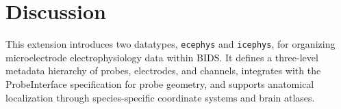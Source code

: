 \documentclass[fleqn,10pt]{article}
\newcommand{\rrid}[1]{\href{https://scicrunch.org/resolver/#1}{#1}}
\begin{document}


\section*{Discussion}\label{sec:discussion}

This extension introduces two datatypes, \texttt{ecephys} and \texttt{icephys}, for organizing microelectrode electrophysiology data within BIDS.
It defines a three-level metadata hierarchy of probes, electrodes, and channels, integrates with the ProbeInterface specification for probe geometry, and supports anatomical localization through species-specific coordinate systems and brain atlases.
\end{document}
